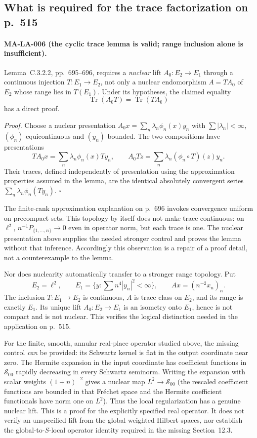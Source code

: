 \subsection{What is required for the trace factorization on p.~515}

\paragraph{MA-LA-006 (the cyclic trace lemma is valid; range inclusion
alone is insufficient).}
Lemma~C.3.2.2, pp.~695--696, requires a \emph{nuclear} lift
$A_0:E_2\to E_1$ through a continuous injection $T:E_1\to E_2$,
not only a nuclear endomorphism $A=TA_0$ of $E_2$ whose range
lies in $T(E_1)$.  Under its hypotheses, the claimed equality
\[
 \operatorname{Tr}(A_0T)=\operatorname{Tr}(TA_0)
 \tag{MA-LA.18}
\]
has a direct proof.

\emph{Proof.}
Choose a nuclear presentation
$A_0x=\sum_n\lambda_n\phi_n(x)y_n$ with
$\sum|\lambda_n|<\infty$, $(\phi_n)$ equicontinuous and
$(y_n)$ bounded.  The two compositions have presentations
\[
 TA_0x=\sum_n\lambda_n\phi_n(x)Ty_n,
 \qquad
 A_0Tz=\sum_n\lambda_n(\phi_n\circ T)(z)y_n.
\]
Their traces, defined independently of presentation using the
approximation properties assumed in the lemma, are the identical
absolutely convergent series
$\sum_n\lambda_n\phi_n(Ty_n)$.
\hfill$\square$

The finite-rank approximation explanation on p.~696 invokes
convergence uniform on precompact sets.  This topology by itself
does not make trace continuous: on $\ell^2$,
$n^{-1}P_{\{1,\ldots,n\}}\to0$ even in operator norm, but each
trace is one.  The nuclear presentation above supplies the needed
stronger control and proves the lemma without that inference.
Accordingly this observation is a repair of a proof detail, not a
counterexample to the lemma.

Nor does nuclearity automatically transfer to a stronger range
topology.  Put
\[
 E_2=\ell^2,\qquad
 E_1=\{y:\sum n^4|y_n|^2<\infty\},\qquad
 A x=(n^{-2}x_n)_n.
\]
The inclusion $T:E_1\to E_2$ is continuous, $A$ is trace class on
$E_2$, and its range is exactly $E_1$.  Its unique lift
$A_0:E_2\to E_1$ is an isometry onto $E_1$, hence is not compact
and is not nuclear.  This verifies the logical distinction needed
in the application on p.~515.

For the finite, smooth, annular real-place operator studied above,
the missing control \emph{can} be provided: its Schwartz kernel is
flat in the output coordinate near zero.  The Hermite expansion
in the input coordinate has coefficient functions in
$\mathcal S_{00}$ rapidly decreasing in every Schwartz seminorm.
Writing the expansion with scalar weights $(1+n)^{-2}$ gives a
nuclear map $L^2\to\mathcal S_{00}$ (the rescaled coefficient
functions are bounded in that Fr\'echet space and the Hermite
coefficient functionals have norm one on $L^2$).  Thus the local
regularization has a genuine nuclear lift.  This is a proof for
the explicitly specified real operator.  It does not verify an
unspecified lift from the global weighted Hilbert spaces, nor
establish the global-to-$S$-local operator identity required in
the missing Section~12.3.

